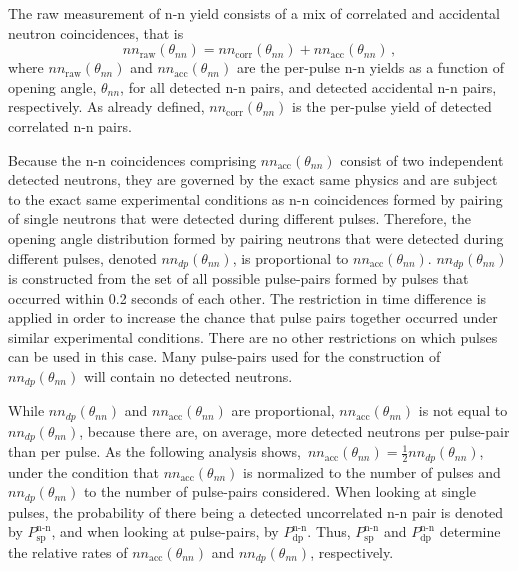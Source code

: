 The raw measurement of n-n yield consists of a mix of correlated and accidental neutron coincidences, that is
\begin{equation}
\label{eq:corr_uncorr}
nn_{\text{raw}}(\theta_{nn})= nn_{\text{corr}}(\theta_{nn}) + nn_{\text{acc}}(\theta_{nn}) \, ,
\end{equation}
where $nn_{\text{raw}}(\theta_{nn})$ and $nn_{\text{acc}}(\theta_{nn})$ are the per-pulse n-n yields as a function of opening angle, $\theta_{nn}$, for all detected n-n pairs, and detected accidental n-n pairs, respectively. As already defined, $ nn_{\text{corr}}(\theta_{nn})$ is the per-pulse yield of detected correlated n-n pairs.

Because the n-n coincidences comprising $nn_{\text{acc}}(\theta_{nn})$ consist of two independent detected neutrons, they are governed by the exact same physics and are subject to the exact same experimental conditions as n-n coincidences formed by pairing of single neutrons that were detected during different pulses.
Therefore, the opening angle distribution formed by pairing neutrons that were detected during different pulses, denoted $nn_{dp}(\theta_{nn})$, is proportional to $nn_{\text{acc}}(\theta_{nn})$.
$nn_{dp}(\theta_{nn})$ is constructed from the set of all possible pulse-pairs formed by pulses that occurred within 0.2 seconds of each other.
The restriction in time difference is applied in order to increase the chance that pulse pairs together occurred under similar experimental conditions.
There are no other restrictions on which pulses can be used in this case.
Many pulse-pairs used for the construction of $nn_{dp}(\theta_{nn})$ will contain no detected neutrons.

While $nn_{dp}(\theta_{nn})$ and $nn_{\text{acc}}(\theta_{nn})$ are proportional, $nn_{\text{acc}}(\theta_{nn})$ is not equal to $nn_{dp}(\theta_{nn})$,  because there are, on average, more detected neutrons per pulse-pair than per pulse.
As the following analysis shows,~$nn_{\text{acc}}(\theta_{nn}) = \frac{1}{2}nn_{dp}(\theta_{nn})$, under the condition that $nn_{\text{acc}}(\theta_{nn})$ is normalized to the number of pulses and $nn_{dp}(\theta_{nn})$ to the number of pulse-pairs considered.
When looking at single pulses, the probability of there being a detected uncorrelated n-n pair is denoted by $P^{\text{n-n}}_{\text{sp}}$, and when looking at pulse-pairs, by $P^{\text{n-n}}_{\text{dp}}$.
Thus, $P^{\text{n-n}}_{\text{sp}}$ and $P^{\text{n-n}}_{\text{dp}}$ determine the relative rates of $nn_{\text{acc}}(\theta_{nn})$ and $nn_{dp}(\theta_{nn})$, respectively.

